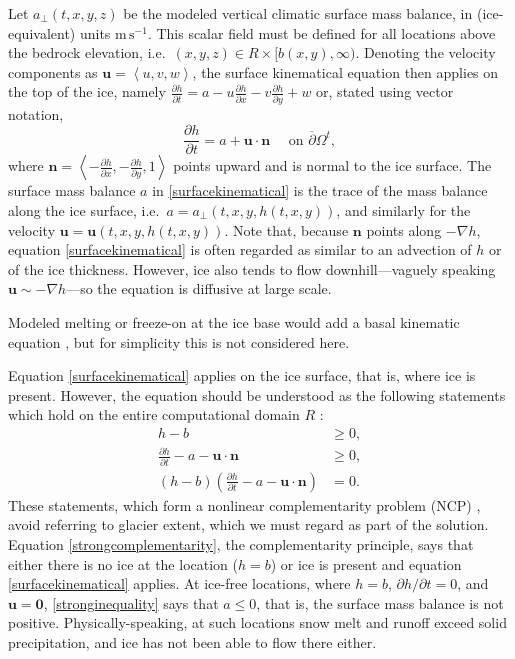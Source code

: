 \documentclass[letterpaper,final,12pt,reqno]{amsart}
\newcommand{\grad}{\nabla}
\newcommand{\bn}{\mathbf{n}}
\newcommand{\bu}{\mathbf{u}}
\newcommand{\bzero}{\bm{0}}
\begin{document}
Let $a_\perp(t,x,y,z)$ be the modeled vertical climatic surface mass balance, in (ice-equivalent) units $\text{m}\,\text{s}^{-1}$.  This scalar field must be defined for all locations above the bedrock elevation, i.e.~$(x,y,z) \in R\times[b(x,y),\infty)$.  Denoting the velocity components as $\bu=\left<u,v,w\right>$, the surface kinematical equation \cite{GreveBlatter2009} then applies on the top of the ice, namely $\frac{\partial h}{\partial t} = a - u \frac{\partial h}{\partial x} - v \frac{\partial h}{\partial y} + w$ or, stated using vector notation,
\begin{equation}
\frac{\partial h}{\partial t} = a + \bu \cdot \bn \quad \text{ on } \overline{\partial}\Omega^t, \label{surfacekinematical}
\end{equation}
where $\bn = \left<-\frac{\partial h}{\partial x},-\frac{\partial h}{\partial y},1\right>$ points upward and is normal to the ice surface.  The surface mass balance $a$ in \eqref{surfacekinematical} is the trace \cite{Evans2010} of the mass balance along the ice surface, i.e.~$a = a_{\perp}(t,x,y,h(t,x,y))$, and similarly for the velocity $\bu = \bu(t,x,y,h(t,x,y))$.  Note that, because $\bn$ points along $-\grad h$, equation \eqref{surfacekinematical} is often regarded as similar to an advection of $h$ or of the ice thickness.  However, ice also tends to flow downhill---vaguely speaking $\bu \sim -\grad h$---so the equation is diffusive at large scale.

Modeled melting or freeze-on at the ice base would add a basal kinematic equation \cite[for example]{Aschwandenetal2012}, but for simplicity this is not considered here.

Equation \eqref{surfacekinematical} applies on the ice surface, that is, where ice is present.  However, the equation should be understood as the following statements which hold on the entire computational domain $R$ \cite{SchoofHewitt2013}:
\begin{align}
h-b &\ge 0, \label{strongadmissibility} \\
\frac{\partial h}{\partial t} - a - \bu \cdot \bn &\ge 0, \label{stronginequality} \\
(h-b) \left(\frac{\partial h}{\partial t} - a - \bu \cdot \bn\right) &= 0. \label{strongcomplementarity}
\end{align}
These statements, which form a nonlinear complementarity problem (NCP) \cite{Bueler2016,Bueler2020}, avoid referring to glacier extent, which we must regard as part of the solution.  Equation \eqref{strongcomplementarity}, the complementarity principle, says that either there is no ice at the location ($h=b$) or ice is present and equation \eqref{surfacekinematical} applies.  At ice-free locations, where $h=b$, $\partial h/\partial t=0$, and $\bu=\bzero$, \eqref{stronginequality} says that $a \le 0$, that is, the surface mass balance is not positive.  Physically-speaking, at such locations snow melt and runoff exceed solid precipitation, and ice has not been able to flow there either.
\end{document}
